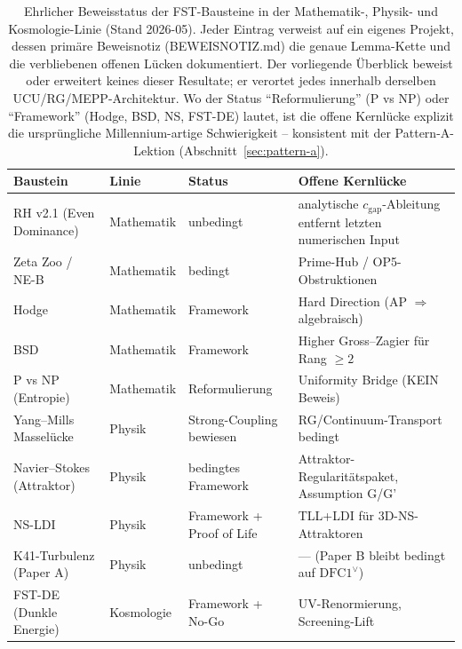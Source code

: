 \documentclass[11pt,a4paper]{article}
\theoremstyle{remark}
\begin{document}
\begin{table}[h]
\centering
\renewcommand{\arraystretch}{1.18}
\small
\begin{tabular}{p{2.8cm}p{2.0cm}p{2.5cm}p{4.3cm}}
\toprule
\textbf{Baustein} & \textbf{Linie} & \textbf{Status} &
\textbf{Offene Kernlücke} \\
\midrule
RH v2.1 (Even Dominance) & Mathematik & unbedingt   & analytische
$c_{\text{gap}}$-Ableitung entfernt letzten numerischen Input \\
Zeta Zoo / NE-B          & Mathematik & bedingt     & Prime-Hub /
OP5-Obstruktionen \\
Hodge                    & Mathematik & Framework   & Hard Direction
(AP $\Rightarrow$ algebraisch) \\
BSD                      & Mathematik & Framework   & Higher
Gross--Zagier für Rang $\ge 2$ \\
P vs NP (Entropie)       & Mathematik & Reformulierung & Uniformity
Bridge (KEIN Beweis) \\
\midrule
Yang--Mills Masselücke   & Physik     & Strong-Coupling bewiesen &
RG/Continuum-Transport bedingt \\
Navier--Stokes (Attraktor)& Physik    & bedingtes Framework &
Attraktor-Regularitätspaket, Assumption G/G' \\
NS-LDI                   & Physik     & Framework + Proof of Life &
TLL+LDI für 3D-NS-Attraktoren \\
K41-Turbulenz (Paper A)  & Physik     & unbedingt   & --- (Paper B
bleibt bedingt auf $\mathrm{DFC1}^{\vee}$) \\
\midrule
FST-DE (Dunkle Energie)  & Kosmologie & Framework + No-Go &
UV-Renormierung, Screening-Lift \\
\bottomrule
\end{tabular}
\caption{Ehrlicher Beweisstatus der FST-Bausteine in der Mathematik-,
Physik- und Kosmologie-Linie (Stand 2026-05). Jeder Eintrag verweist auf
ein eigenes Projekt, dessen primäre Beweisnotiz (BEWEISNOTIZ.md) die
genaue Lemma-Kette und die verbliebenen offenen Lücken dokumentiert.
Der vorliegende Überblick beweist oder erweitert keines dieser Resultate;
er verortet jedes innerhalb derselben UCU/RG/MEPP-Architektur. Wo der
Status ``Reformulierung'' (P vs NP) oder ``Framework'' (Hodge, BSD,
NS, FST-DE) lautet, ist die offene Kernlücke explizit die ursprüngliche
Millennium-artige Schwierigkeit -- konsistent mit der Pattern-A-Lektion
(Abschnitt~\ref{sec:pattern-a}).}
\label{tab:building-blocks}
\end{table}
\end{document}
